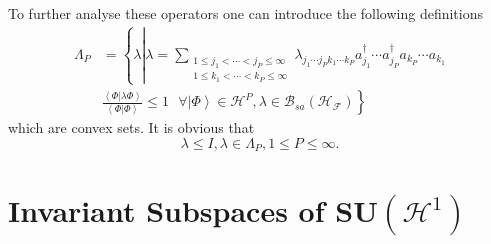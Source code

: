 \documentclass[aps,preprint]{revtex4}%
\begin{document}
To further analyse these operators one can introduce the following
definitions
\begin{align}
\Lambda_{P}  &  =\left\{  \lambda\left\vert \lambda=\sum_{\substack{1\leq
j_{1}<\cdots<j_{P}\leq\infty\\1\leq k_{1}<\cdots<k_{P}\leq\infty}%
}\lambda_{j_{1}\cdots j_{P}k_{1}\cdots k_{P}}a_{j_{1}}^{\dagger}\cdots
a_{j_{P}}^{\dagger}a_{k_{P}}\cdots a_{k_{1}}\right.  \right. \nonumber\\
&  \left.  \frac{\left\langle \left.  \Phi\right\vert \lambda\Phi\right\rangle
}{\left\langle \left.  \Phi\right\vert \Phi\right\rangle }\leq1\text{ }%
\forall\left\vert \Phi\right\rangle \in\mathcal{H}^{P},\lambda\in
\mathcal{B}_{sa}\left(  \mathcal{H}_{\mathcal{F}}\right)  \right\}
\end{align}
which are convex sets. It is obvious that
\begin{equation}
\lambda\leq I,\lambda\in\Lambda_{P},1\leq P\leq\infty.
\end{equation}


\section{Invariant Subspaces of SU$\left(  \mathcal{H}^{1}\right)  $}
\end{document}
